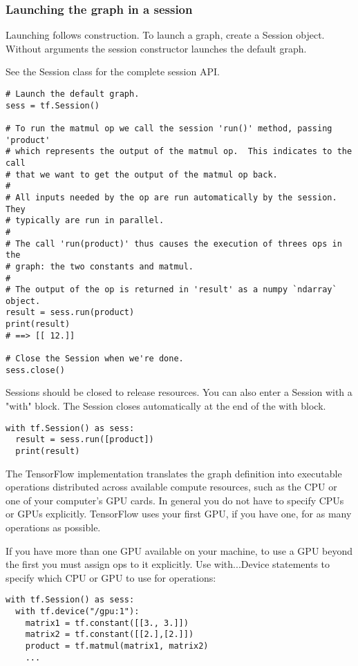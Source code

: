 \documentclass[a4paper,11pt,twoside]{ctexbook}
\begin{document}
\subsubsection {Launching the graph in a session}

Launching follows construction. To launch a graph, create a Session object. Without arguments the session constructor launches the default graph.

See the Session class for the complete session API.

\begin{lstlisting}
# Launch the default graph.
sess = tf.Session()

# To run the matmul op we call the session 'run()' method, passing 'product'
# which represents the output of the matmul op.  This indicates to the call
# that we want to get the output of the matmul op back.
#
# All inputs needed by the op are run automatically by the session.  They
# typically are run in parallel.
#
# The call 'run(product)' thus causes the execution of threes ops in the
# graph: the two constants and matmul.
#
# The output of the op is returned in 'result' as a numpy `ndarray` object.
result = sess.run(product)
print(result)
# ==> [[ 12.]]

# Close the Session when we're done.
sess.close()
\end{lstlisting}

Sessions should be closed to release resources. You can also enter a Session with a "with" block. The Session closes automatically at the end of the with block.

\begin{lstlisting}
with tf.Session() as sess:
  result = sess.run([product])
  print(result)
\end{lstlisting}

The TensorFlow implementation translates the graph definition into executable operations distributed across available compute resources, such as the CPU or one of your computer's GPU cards. In general you do not have to specify CPUs or GPUs explicitly. TensorFlow uses your first GPU, if you have one, for as many operations as possible.

If you have more than one GPU available on your machine, to use a GPU beyond the first you must assign ops to it explicitly. Use with...Device statements to specify which CPU or GPU to use for operations:

\begin{lstlisting}
with tf.Session() as sess:
  with tf.device("/gpu:1"):
    matrix1 = tf.constant([[3., 3.]])
    matrix2 = tf.constant([[2.],[2.]])
    product = tf.matmul(matrix1, matrix2)
    ...
\end{lstlisting}
\end{document}
